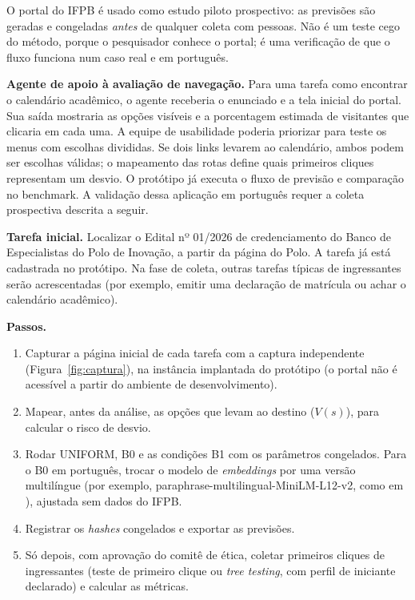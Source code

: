 \documentclass[12pt]{article}
\begin{document}
\begin{planejado}
O portal do IFPB é usado como estudo piloto prospectivo: as previsões são geradas e congeladas \emph{antes} de qualquer coleta com pessoas. Não é um teste cego do método, porque o pesquisador conhece o portal; é uma verificação de que o fluxo funciona num caso real e em português.
\end{planejado}

\textbf{Agente de apoio à avaliação de navegação.} Para uma tarefa como encontrar o calendário acadêmico, o agente receberia o enunciado e a tela inicial do portal. Sua saída mostraria as opções visíveis e a porcentagem estimada de visitantes que clicaria em cada uma. A equipe de usabilidade poderia priorizar para teste os menus com escolhas divididas. Se dois links levarem ao calendário, ambos podem ser escolhas válidas; o mapeamento das rotas define quais primeiros cliques representam um desvio. O protótipo já executa o fluxo de previsão e comparação no benchmark. A validação dessa aplicação em português requer a coleta prospectiva descrita a seguir.

\textbf{Tarefa inicial.} Localizar o Edital nº 01/2026 de credenciamento do Banco de Especialistas do Polo de Inovação, a partir da página do Polo. A tarefa já está cadastrada no protótipo. Na fase de coleta, outras tarefas típicas de ingressantes serão acrescentadas (por exemplo, emitir uma declaração de matrícula ou achar o calendário acadêmico).

\textbf{Passos.}
\begin{enumerate}[leftmargin=*,itemsep=1pt]
\item Capturar a página inicial de cada tarefa com a captura independente (Figura~\ref{fig:captura}), na instância implantada do protótipo (o portal não é acessível a partir do ambiente de desenvolvimento).
\item Mapear, antes da análise, as opções que levam ao destino ($V(s)$), para calcular o risco de desvio.
\item Rodar UNIFORM, B0 e as condições B1 com os parâmetros congelados. Para o B0 em português, trocar o modelo de \textit{embeddings} por uma versão multilíngue (por exemplo, paraphrase-multilingual-MiniLM-L12-v2, como em \cite{jin2026scent}), ajustada sem dados do IFPB.
\item Registrar os \textit{hashes} congelados e exportar as previsões.
\item Só depois, com aprovação do comitê de ética, coletar primeiros cliques de ingressantes (teste de primeiro clique ou \textit{tree testing}, com perfil de iniciante declarado) e calcular as métricas.
\end{enumerate}
\end{document}
